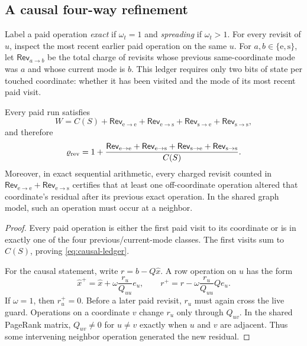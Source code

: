 \subsection{A causal four-way refinement}

Label a paid operation \emph{exact} if $\omega_t=1$ and \emph{spreading} if
$\omega_t>1$.  For every revisit of $u$, inspect the most recent earlier paid
operation on the same $u$.  For $a,b\in\{\mathrm e,\mathrm s\}$, let
$\mathsf{Rev}_{a\to b}$ be the total charge of revisits whose previous same-coordinate
mode was $a$ and whose current mode is $b$.  This ledger requires only two
bits of state per touched coordinate: whether it has been visited and the
mode of its most recent paid visit.

\begin{proposition}
\label{prop:causal-ledger}
Every paid run satisfies
\begin{equation}
 W=C(S)+\mathsf{Rev}_{\mathrm e\to\mathrm e}
       +\mathsf{Rev}_{\mathrm e\to\mathrm s}
       +\mathsf{Rev}_{\mathrm s\to\mathrm e}
       +\mathsf{Rev}_{\mathrm s\to\mathrm s},
 \label{eq:causal-ledger}
\end{equation}
and therefore
\begin{equation}
 \varrho_{\rm rev}
 =1+\frac{\mathsf{Rev}_{\mathrm e\to\mathrm e}
       +\mathsf{Rev}_{\mathrm e\to\mathrm s}
       +\mathsf{Rev}_{\mathrm s\to\mathrm e}
       +\mathsf{Rev}_{\mathrm s\to\mathrm s}}{C(S)}.
 \label{eq:causal-ratio}
\end{equation}
Moreover, in exact sequential arithmetic, every charged revisit counted in
$\mathsf{Rev}_{\mathrm e\to\mathrm e}
 +\mathsf{Rev}_{\mathrm e\to\mathrm s}$ certifies that at
least one off-coordinate operation altered that coordinate's residual after
its previous exact operation.  In the shared graph model, such an operation
must occur at a neighbor.
\end{proposition}

\begin{proof}
Every paid operation is either the first paid visit to its coordinate or is
in exactly one of the four previous/current-mode classes.  The first visits
sum to $C(S)$, proving \eqref{eq:causal-ledger}.

For the causal statement, write $r=b-Q\widehat x$.  A row operation on $u$
has the form
\begin{equation}
 \widehat x^+=\widehat x+\omega\frac{r_u}{Q_{uu}}e_u,
 \qquad
 r^+=r-\omega\frac{r_u}{Q_{uu}}Qe_u.
 \label{eq:row-update}
\end{equation}
If $\omega=1$, then $r_u^+=0$.  Before a later paid revisit, $r_u$ must
again cross the live guard.  Operations on a coordinate $v$ change $r_u$
only through $Q_{uv}$.  In the shared PageRank matrix, $Q_{uv}\neq0$ for
$u\neq v$ exactly when $u$ and $v$ are adjacent.  Thus some intervening
neighbor operation generated the new residual.
\end{proof}

